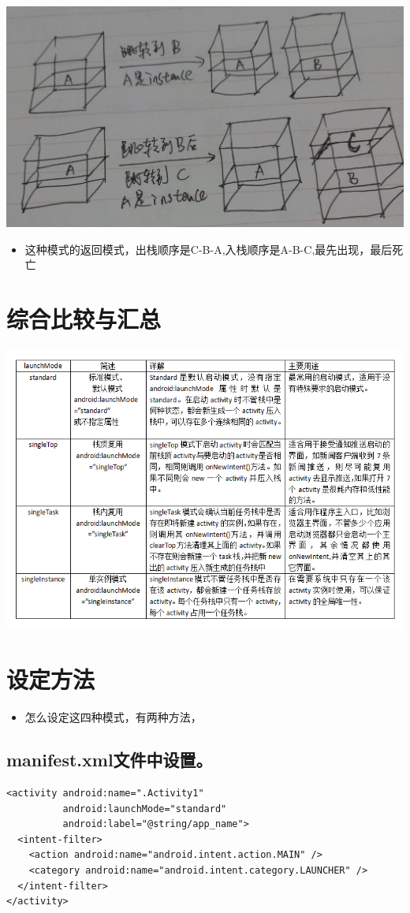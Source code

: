 \documentclass[9pt, b5paaper]{book}
\begin{document}
\includegraphics[width=.9\linewidth]{./pic/singleInstance.jpg}
\begin{itemize}
\item 这种模式的返回模式，出栈顺序是C-B-A,入栈顺序是A-B-C,最先出现，最后死亡
\end{itemize}

\section{综合比较与汇总}
\label{sec-4-5}

\includegraphics[width=.9\linewidth]{./pic/launchmode.png}

\section{设定方法}
\label{sec-4-6}
\begin{itemize}
\item 怎么设定这四种模式，有两种方法，
\end{itemize}
\subsection{manifest.xml文件中设置。}
\label{sec-4-6-1}
\begin{verbatim}
<activity android:name=".Activity1" 
          android:launchMode="standard" 
          android:label="@string/app_name"> 
  <intent-filter> 
    <action android:name="android.intent.action.MAIN" /> 
    <category android:name="android.intent.category.LAUNCHER" /> 
  </intent-filter> 
</activity>
\end{verbatim}
\end{document}
